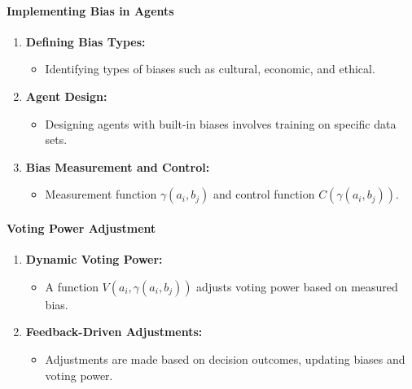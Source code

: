 \documentclass{article}
\begin{document}
\hypertarget{implementing-bias-in-agents}{%
\paragraph{Implementing Bias in
Agents}\label{implementing-bias-in-agents}}

\begin{enumerate}
\def\labelenumi{\arabic{enumi}.}
\item
  \textbf{Defining Bias Types:}

  \begin{itemize}
  \item
    Identifying types of biases such as cultural, economic, and ethical.
  \end{itemize}
\item
  \textbf{Agent Design:}

  \begin{itemize}
  \item
    Designing agents with built-in biases involves training on specific
    data sets.
  \end{itemize}
\item
  \textbf{Bias Measurement and Control:}

  \begin{itemize}
  \item
    Measurement function \( \gamma(a_i, b_j) \) and control function
    \( C(\gamma(a_i, b_j)) \).
  \end{itemize}
\end{enumerate}

\hypertarget{voting-power-adjustment}{%
\paragraph{Voting Power Adjustment}\label{voting-power-adjustment}}

\begin{enumerate}
\def\labelenumi{\arabic{enumi}.}
\item
  \textbf{Dynamic Voting Power:}

  \begin{itemize}
  \item
    A function \( V(a_i, \gamma(a_i, b_j)) \) adjusts voting power
    based on measured bias.
  \end{itemize}
\item
  \textbf{Feedback-Driven Adjustments:}

  \begin{itemize}
  \item
    Adjustments are made based on decision outcomes, updating biases and
    voting power.
  \end{itemize}
\end{enumerate}
\end{document}
